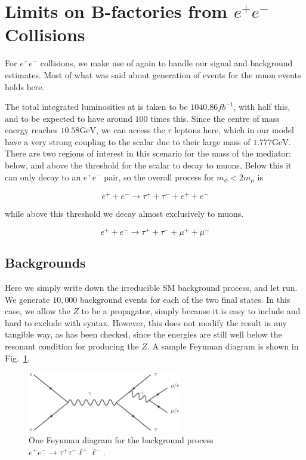 \section{Limits on B-factories from $e^+ e^-$ Collisions}
For $e^+ e^-$ collisions, we make use of \madgraph again to handle our signal and background estimates.
Most of what was said about generation of events for the muon events holds here.

The total integrated luminosities at \belle is taken to be $1040.86fb^{-1}$, with \babar half this, and \belleii to be expected to have around $100$ times this.
Since the centre of mass energy reaches $10.58\textrm{GeV}$, we can access the $\tau$ leptons here, which in our model have a very strong coupling to the scalar due to their large mass of $1.777\textrm{GeV}$.
There are two regions of interest in this scenario for the mass of the mediator: below, and above the threshold for the scalar to decay to muons.
Below this it can only decay to an $e^+ e^-$ pair, so the overall process for $m_\phi < 2m_\mu$ is

\begin{equation}
    e^+ + e^- \rightarrow \tau^+ + \tau^- + e^+ + e^-
\end{equation}

\noindent while above this threshold we decay almost exclusively to muons.

\begin{equation}
    e^+ + e^- \rightarrow \tau^+ + \tau^- + \mu^+ + \mu^-
\end{equation}

\subsection{Backgrounds}
Here we simply write down the irreducible SM background process, and let \madgraph run.
We generate $10,000$ background events for each of the two final states.
In this case, we allow the $Z$ to be a propagator, simply because it is easy to include and hard to exclude with \madgraph syntax.
However, this does not modify the result in any tangible way, as has been checked, since the energies are still well below the resonant condition for producing the $Z$.
A sample Feynman diagram is shown in Fig.\ \ref{fig:ee_tautaull_SM}.

\begin{figure}[h]
    \centering
    \includegraphics[width=0.6\textwidth]{Figures/feynman_diagrams/ee_tautaull_SM}
    \caption{One Feynman diagram for the background process $e^+ e^- \rightarrow \tau^+ \tau^- \ell^+ \ell^-$.}
    \label{fig:ee_tautaull_SM}
\end{figure}


